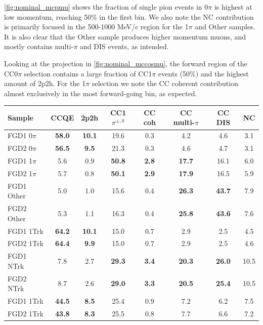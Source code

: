 \autoref{fig:nominal_mcpmu} shows the fraction of single pion events in 0$\pi$ is highest at low momentum, reaching 50\% in the first bin. We also note the NC contribution is primarily focused in the 500-1000 MeV/c region for the 1$\pi$ and Other samples. It is also clear that the Other sample produces higher momentum muons, and mostly contains multi-$\pi$ and DIS events, as intended. 

Looking at the \cosmu projection in \autoref{fig:nominal_mccosmu}, the forward region of the CC0$\pi$ selection contains a large fraction of CC1$\pi$ events (50\%) and the highest amount of 2p2h. For the 1$\pi$ selection we note the CC coherent contribution almost exclusively in the most forward-going bin, as expected.
\begin{table}
	\centering
	\begin{tabular}{l | c c c c c c | c}
		\hline
		\hline
		Sample 			& CCQE & 2p2h & CC1$\pi^{\pm,0}$ 	& CC coh 	& CC multi-$\pi$ & CC DIS  	& NC \\
		\hline
		FGD1 0$\pi$	    & \textbf{58.0} & \textbf{10.1} & 19.6 & 0.3 & 4.2 & 4.6 & 3.1 \\
		FGD2 0$\pi$	    & \textbf{56.5} & \textbf{9.5}  & 21.3 & 0.3 & 4.6 & 4.7 & 3.1 \\
		\hline
		FGD1 1$\pi$	    & 5.6 & 0.9 & \textbf{50.8} & \textbf{2.8} & \textbf{17.7} & 16.1 & 6.0 \\
		FGD2 1$\pi$	    & 5.7 & 0.8 & \textbf{50.1} & \textbf{2.9} & \textbf{17.9} & 16.5 & 5.9 \\
		\hline
		FGD1 Other	    & 5.0 & 1.0 & 15.6 & 0.4 & \textbf{26.3} & \textbf{43.7} & 7.9 \\
		FGD2 Other	    & 5.3 & 1.1 & 16.3 & 0.4 & \textbf{25.8} & \textbf{43.6} & 7.6 \\
		\hline
		FGD1 1Trk	    	& \textbf{64.2} & \textbf{10.1} & 15.0 & 0.7 & 2.9 & 2.5 & 4.5 \\
		FGD2 1Trk	    	& \textbf{64.4} & \textbf{9.9} & 15.0 & 0.7 & 2.9 & 2.5 & 4.6 \\
		\hline
		FGD1 NTrk	    	& 7.8 & 2.7 & \textbf{29.3} & \textbf{3.4} & \textbf{20.3} & \textbf{26.0} & 10.5 \\ 
		FGD2 NTrk	  		& 8.7 & 2.6 & \textbf{29.0} & \textbf{3.3} & \textbf{20.5} & \textbf{25.4} & 10.5 \\
		\hline
		FGD1 1Trk   \numu 	& \textbf{44.5} & \textbf{8.5} & 25.4 & 0.9 & 7.2 & 6.2 & 7.5 \\
		FGD2 1Trk	\numu   & \textbf{43.8} & \textbf{8.3} & 25.5 & 0.8 & 7.7 & 6.6 & 7.2 \\

\end{tabular}
\end{table}
